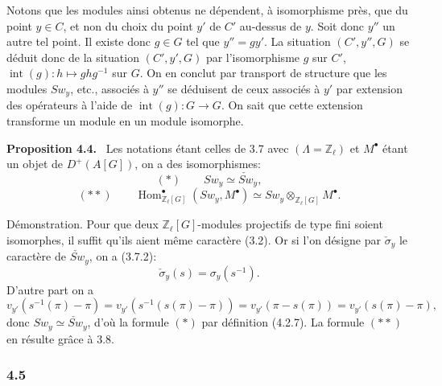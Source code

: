 \documentclass[11pt]{article}
\newenvironment{statement}[1]{\par\medskip\noindent\textbf{#1.}\ }{\par\medskip}
\DeclareMathOperator{\Hom}{Hom}
\providecommand{\Hom}{\operatorname{Hom}}
\providecommand{\Hom}{\operatorname{Hom}}
\begin{document}
Notons que les modules ainsi obtenus ne dépendent, à isomorphisme près, que du point $y\in C$, et non du choix du point $y'$ de $C'$ au-dessus de $y$. Soit donc $y''$ un autre tel point. Il existe donc $g\in G$ tel que $y''=g y'$. La situation $(C',y'',G)$ se déduit donc de la situation $(C',y',G)$ par l'isomorphisme $g$ sur $C'$, $\operatorname{int}(g):h\mapsto ghg^{-1}$ sur $G$. On en conclut par transport de structure que les modules $Sw_y$, etc., associés à $y''$ se déduisent de ceux associés à $y'$ par extension des opérateurs à l'aide de $\operatorname{int}(g):G\to G$. On sait que cette extension transforme un module en un module isomorphe.

\begin{statement}{Proposition 4.4}
Les notations étant celles de 3.7 avec $(\Lambda=\mathbb Z_\ell)$ et $M^\bullet$ étant un objet de $D^+(A[G])$, on a des isomorphismes:
\[
(*)\qquad Sw_y\simeq \check{Sw}_y,
\]
\[
(**)\qquad
\Hom^\bullet_{\mathbb Z_\ell[G]}(Sw_y,M^\bullet)
\simeq Sw_y\otimes_{\mathbb Z_\ell[G]}M^\bullet.
\]
\end{statement}

Démonstration. Pour que deux $\mathbb Z_\ell[G]$-modules projectifs de type fini soient isomorphes, il suffit qu'ils aient même caractère (3.2). Or si l'on désigne par $\check\sigma_y$ le caractère de $\check{Sw}_y$, on a (3.7.2):
\[
\check\sigma_y(s)=\sigma_y(s^{-1}).
\]
D'autre part on a
\[
v_{y'}(s^{-1}(\pi)-\pi)
=v_{y'}(s^{-1}(s(\pi)-\pi))
=v_{y'}(\pi-s(\pi))
=v_{y'}(s(\pi)-\pi),
\]
donc $Sw_y\simeq\check{Sw}_y$, d'où la formule $(*)$ par définition (4.2.7). La formule $(**)$ en résulte grâce à 3.8.

\subsubsection*{4.5}
\end{document}
